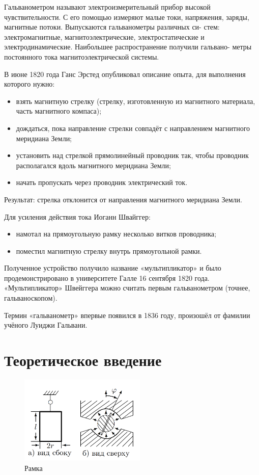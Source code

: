 \documentclass[12pt]{kiarticle} %
\begin{document}
	Гальванометром называют электроизмерительный прибор высокой
	чувствительности. С его помощью измеряют малые токи, напряжения,
	заряды, магнитные потоки. Выпускаются гальванометры различных си-
	стем: электромагнитные, магнитоэлектрические, электростатические и
	электродинамические. Наибольшее распространение получили гальвано-
	метры постоянного тока магнитоэлектрической системы. 
	
	В июне 1820 года Ганс Эрстед опубликовал описание опыта, для выполнения которого нужно:
	
	\begin{itemize}
		\item взять магнитную стрелку (стрелку, изготовленную из магнитного материала, часть магнитного компаса);
		\item	дождаться, пока направление стрелки совпадёт с направлением магнитного меридиана Земли;
		\item	установить над стрелкой прямолинейный проводник так, чтобы проводник располагался вдоль магнитного меридиана Земли;
		\item	начать пропускать через проводник электрический ток.
	\end{itemize}

	Результат: стрелка отклонится от направления магнитного меридиана Земли.
	
	
	Для усиления действия тока Иоганн Швайггер:
	
	\begin{itemize}
		\item намотал на прямоугольную рамку несколько витков проводника;
		\item поместил магнитную стрелку внутрь прямоугольной рамки.
	\end{itemize}

	Полученное устройство получило название «мультипликатор» и было продемонстрировано в университете Галле 16 сентября 1820 года. «Мультипликатор» Швейггера можно считать первым гальванометром (точнее, гальваноскопом).
	
	Термин «гальванометр» впервые появился в 1836 году, произошёл от фамилии учёного Луиджи Гальвани.
	
	
	\section{Теоретическое введение}
	
	\begin{figure} 
		\includegraphics[width=6cm]{ramka}
		\caption{Рамка}
		\label{}
	\end{figure}
\end{document}
